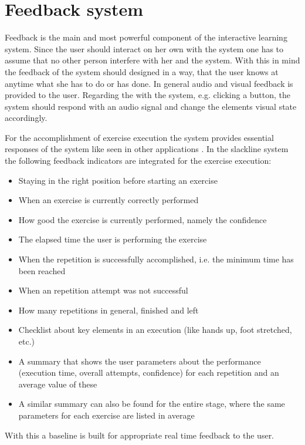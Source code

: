 \section{Feedback system}\label{4_6_feedbackSystem}
Feedback is the main and most powerful component of the interactive learning system. Since the user should interact on her own with the system one has to assume that no other person interfere with her and the system. With this in mind the feedback of the system should designed in a way, that the user knows at anytime what she has to do or has done. In general audio and visual feedback is provided to the user. Regarding the \textbf{} with the system, e.g. clicking a button, the system should respond with an audio signal and change the elements visual state accordingly.

For the accomplishment of exercise execution the system provides essential responses of the system like seen in other applications . In the slackline system the following feedback indicators are integrated for the exercise execution:
\begin{itemize}
\item Staying in the right position before starting an exercise
\item When an exercise is currently correctly performed
\item How good the exercise is currently performed, namely the confidence
\item The elapsed time the user is performing the exercise
\item When the repetition is successfully accomplished, i.e. the minimum time has been reached
\item When an repetition attempt was not successful
\item How many repetitions in general, finished and left
\item Checklist about key elements in an execution (like hands up, foot stretched, etc.)
\item A summary that shows the user parameters about the performance (execution time, overall attempts, confidence) for each repetition and an average value of these
\item A similar summary can also be found for the entire stage, where the same parameters for each exercise are listed in average
\end{itemize}
With this a baseline is built for appropriate real time feedback to the user.

